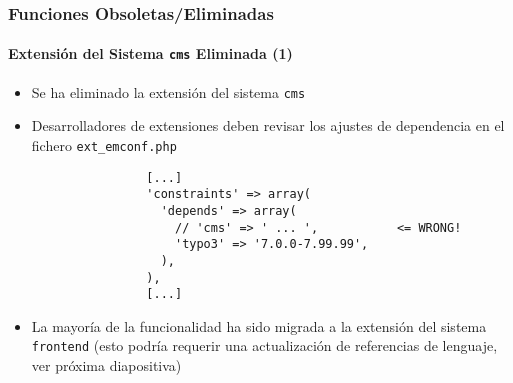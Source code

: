 \begin{frame}[fragile]
	\frametitle{Funciones Obsoletas/Eliminadas}
	\framesubtitle{Extensión del Sistema \texttt{cms} Eliminada (1)}

	\lstset{basicstyle=\tiny\ttfamily}

	\begin{itemize}

		\item Se ha eliminado la extensión del sistema \texttt{cms}

		\item Desarrolladores de extensiones deben revisar los ajustes de dependencia en el fichero \texttt{ext\_emconf.php}

			\begin{lstlisting}
				[...]
				'constraints' => array(
				  'depends' => array(
				    // 'cms' => ' ... ',           <= WRONG!
				    'typo3' => '7.0.0-7.99.99',
				  ),
				),
				[...]
			\end{lstlisting}

		\item La mayoría de la funcionalidad ha sido migrada a la extensión del sistema \texttt{frontend}
			(esto podría requerir una actualización de referencias de lenguaje, ver próxima diapositiva)

	\end{itemize}

\end{frame}


